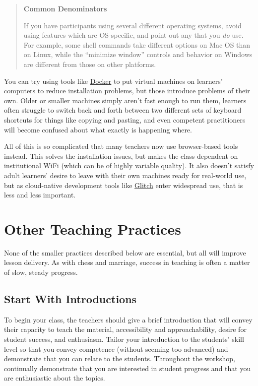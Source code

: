 \begin{quote}\setlength{\parindent}{0pt}
\textbf{Common Denominators}

If you have participants using several different operating systems,
avoid using features which are OS-specific, and point out any that you
\emph{do} use. For example, some shell commands take different options on
Mac OS than on Linux, while the ``minimize window'' controls and
behavior on Windows are different from those on other platforms.
\end{quote}

You can try using tools like \href{http://docker.com}{Docker} to put virtual machines
on learners' computers to reduce installation problems, but those
introduce problems of their own. Older or smaller machines simply
aren't fast enough to run them, learners often struggle to switch back
and forth between two different sets of keyboard shortcuts for things
like copying and pasting, and even competent practitioners will become
confused about what exactly is happening where.

All of this is so complicated that many teachers now use browser-based
tools instead. This solves the installation issues, but makes the
class dependent on institutional WiFi (which can be of highly variable
quality). It also doesn't satisfy adult learners' desire to leave with
their own machines ready for real-world use, but as cloud-native
development tools like \href{https://glitch.com/}{Glitch} enter widespread use, that is
less and less important.

\section{Other Teaching Practices}\label{s:classroom-practices}

None of the smaller practices described below are essential, but all
will improve lesson delivery. As with chess and marriage, success in
teaching is often a matter of slow, steady progress.

\subsection{Start With Introductions}\label{start-with-introductions}

To begin your class, the teachers should give a brief introduction that
will convey their capacity to teach the material, accessibility and
approachability, desire for student success, and enthusiasm. Tailor your
introduction to the students' skill level so that you convey competence
(without seeming too advanced) and demonstrate that you can relate to
the students. Throughout the workshop, continually demonstrate that you
are interested in student progress and that you are enthusiastic about
the topics.

